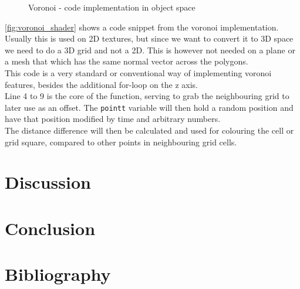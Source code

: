 \documentclass{article}
\begin{document}
\begin{figure}[H]
    \centering
    
    \caption{Voronoi - code implementation in object space}
    \label{fig:voronoi_shader}
\end{figure}
\autoref{fig:voronoi_shader} shows a code snippet from the voronoi implementation. Usually this is used on 2D textures, but since we want to convert it to 3D space we need to do a 3D grid and not a 2D. This is however not needed on a plane or a mesh that which has the same normal vector across the polygons.\\
This code is a very standard or conventional way of implementing voronoi features, besides the additional for-loop on the z axis.\\

Line 4 to 9 is the core of the function, serving to grab the neighbouring grid to later use as an offset. The \texttt{pointt} variable will then hold a random position and have that position modified by time and arbitrary numbers.\\The distance difference will then be calculated and used for colouring the cell or grid square, compared to other points in neighbouring grid cells.

\section{Discussion}
\label{sec:discussion}


\section{Conclusion}
\label{sec:conclusion}



\newpage
\section{Bibliography}
\printbibliography
\end{document}
